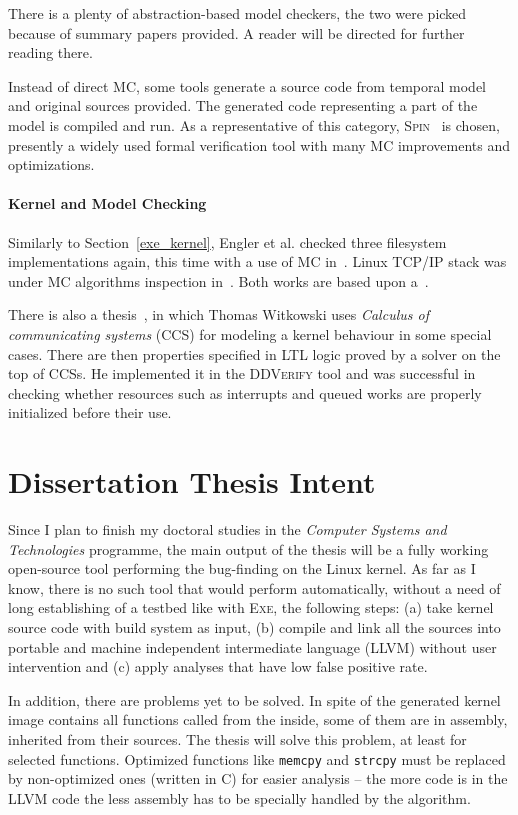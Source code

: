 \documentclass[11pt,a4paper]{article}
\begin{document}
There is a plenty of abstraction-based model checkers, the two were picked
because of summary papers provided. A reader will be directed for further
reading there.

Instead of direct MC, some tools generate a source code from temporal model
and original sources provided. The generated code representing a part of
the model is compiled and run. As a representative of this category,
\textsc{Spin}~\cite{spin} is chosen, presently a widely used formal
verification tool with many MC improvements and optimizations.

\paragraph{Kernel and Model Checking} \label{mc_kernel} Similarly to
Section~\ref{exe_kernel}, Engler et al. checked three filesystem
implementations again, this time with a use of MC in~\cite{mc_kernel_fs}.
Linux TCP/IP stack was under MC algorithms inspection in~\cite{mc_kernel_ip}.
Both works are based upon a~\cite{cmc}.

There is also a thesis~\cite{kernel_master_thesis}, in which Thomas Witkowski
uses \emph{Calculus of communicating systems} (CCS) for modeling a kernel
behaviour in some special cases. There are then properties specified in LTL
logic proved by a solver on the top of CCSs. He implemented it in the
\textsc{DDVerify} tool and was successful in checking whether resources such
as interrupts and queued works are properly initialized before their use.

\newpage

\section{Dissertation Thesis Intent}
\label{intent}
Since I plan to finish my doctoral studies in the \emph{Computer Systems and
Technologies} programme, the main output of the thesis will be a fully working
open-source tool performing the bug-finding on the Linux kernel. As far as I
know, there is no such tool that would perform automatically, without a need
of long establishing of a testbed like with \textsc{Exe}, the following steps:
(a) take kernel source code with build system as input, (b) compile and link
all the sources into portable and machine independent intermediate language
(LLVM) without user intervention and (c) apply analyses that have low false
positive rate.

In addition, there are problems yet to be solved. In spite of the generated
kernel image contains all functions called from the inside, some of them are
in assembly, inherited from their sources. The thesis will solve this problem,
at least for selected functions. Optimized functions like \texttt{memcpy} and
\texttt{strcpy} must be replaced by non-optimized ones (written in C) for
easier analysis -- the more code is in the LLVM code the less assembly has to
be specially handled by the algorithm.
\end{document}
